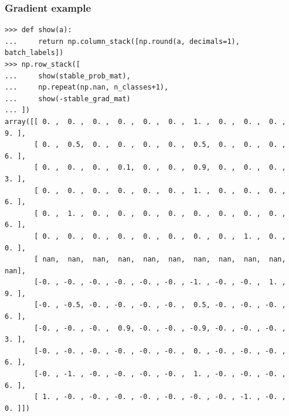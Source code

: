 \message{ !name(06-backprop.tex)}\documentclass{beamer}
\begin{document}
\begin{frame}[fragile]
  \frametitle{Gradient example}
  \scriptsize
\begin{verbatim}
>>> def show(a):
...     return np.column_stack([np.round(a, decimals=1), batch_labels])
>>> np.row_stack([
...     show(stable_prob_mat),
...     np.repeat(np.nan, n_classes+1),
...     show(-stable_grad_mat)
... ])
array([[ 0. ,  0. ,  0. ,  0. ,  0. ,  0. ,  1. ,  0. ,  0. ,  0. ,  9. ],
       [ 0. ,  0.5,  0. ,  0. ,  0. ,  0. ,  0.5,  0. ,  0. ,  0. ,  6. ],
       [ 0. ,  0. ,  0. ,  0.1,  0. ,  0. ,  0.9,  0. ,  0. ,  0. ,  3. ],
       [ 0. ,  0. ,  0. ,  0. ,  0. ,  0. ,  1. ,  0. ,  0. ,  0. ,  6. ],
       [ 0. ,  1. ,  0. ,  0. ,  0. ,  0. ,  0. ,  0. ,  0. ,  0. ,  6. ],
       [ 0. ,  0. ,  0. ,  0. ,  0. ,  0. ,  0. ,  0. ,  1. ,  0. ,  0. ],
       [ nan,  nan,  nan,  nan,  nan,  nan,  nan,  nan,  nan,  nan,  nan],
       [-0. , -0. , -0. , -0. , -0. , -0. , -1. , -0. , -0. ,  1. ,  9. ],
       [-0. , -0.5, -0. , -0. , -0. , -0. ,  0.5, -0. , -0. , -0. ,  6. ],
       [-0. , -0. , -0. ,  0.9, -0. , -0. , -0.9, -0. , -0. , -0. ,  3. ],
       [-0. , -0. , -0. , -0. , -0. , -0. ,  0. , -0. , -0. , -0. ,  6. ],
       [-0. , -1. , -0. , -0. , -0. , -0. ,  1. , -0. , -0. , -0. ,  6. ],
       [ 1. , -0. , -0. , -0. , -0. , -0. , -0. , -0. , -1. , -0. ,  0. ]])
\end{verbatim}
\end{frame}


\end{document}
